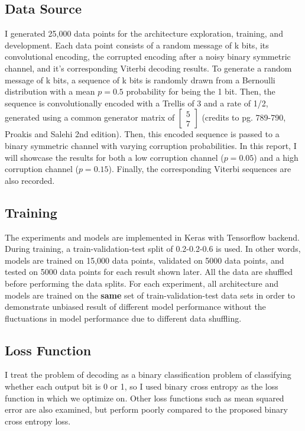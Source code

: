 \documentclass[10pt,twocolumn,letterpaper]{article}
\begin{document}
\subsection{Data Source}
I generated 25,000 data points for the architecture exploration, training, and development. Each data point consists of a random message of k bits, its convolutional encoding, the corrupted encoding after a noisy binary symmetric channel, and it's corresponding Viterbi decoding results. To generate a random message of k bits, a sequence of k bits is randomly drawn from a Bernoulli distribution with a mean $p=0.5$ probability for being the 1 bit. Then, the sequence is convolutionally encoded with a Trellis of 3 and a rate of 1/2, generated using a common generator matrix of $\begin{bmatrix}5 \\ 7\end{bmatrix}$ (credits to pg. 789-790, Proakis and Salehi 2nd edition). Then, this encoded sequence is passed to a binary symmetric channel with varying corruption probabilities. In this report, I will showcase the results for both a low corruption channel ($p=0.05$) and a high corruption channel ($p=0.15$). Finally, the corresponding Viterbi sequences are also recorded.

\subsection{Training}
The experiments and models are implemented in Keras with Tensorflow backend. During training, a train-validation-test split of 0.2-0.2-0.6 is used. In other words, models are trained on 15,000 data points, validated on 5000 data points, and tested on 5000 data points for each result shown later. All the data are shuffled before performing the data splits. For each experiment, all architecture and models are trained on the \textbf{same} set of train-validation-test data sets in order to demonstrate unbiased result of different model performance without the fluctuations in model performance due to different data shuffling.

\subsection{Loss Function}

I treat the problem of decoding as a binary classification problem of classifying whether each output bit is 0 or 1, so I used binary cross entropy as the loss function in which we optimize on. Other loss functions such as mean squared error are also examined, but perform poorly compared to the proposed binary cross entropy loss.
\end{document}
